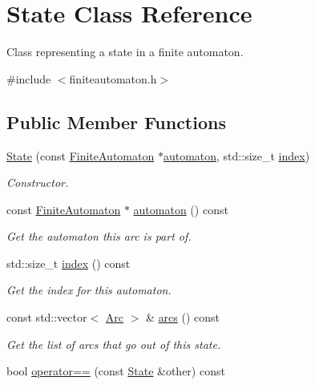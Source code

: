 \hypertarget{class_state}{\section{\-State \-Class \-Reference}
\label{class_state}
}


\-Class representing a state in a finite automaton.  




{\ttfamily \#include $<$finiteautomaton.\-h$>$}

\subsection*{\-Public \-Member \-Functions}
\begin{DoxyCompactItemize}
\item 
\hyperlink{class_state_a8c894ecdccae131bfbb0dcac55071f93}{\-State} (const \hyperlink{class_finite_automaton}{\-Finite\-Automaton} $\ast$\hyperlink{class_state_a8c07e7bc955ab9bd9cfc3691903269a6}{automaton}, std\-::size\-\_\-t \hyperlink{class_state_ae85fe3e5a9af340890a6bca98eeb31cc}{index})
\begin{DoxyCompactList}\small\item\em \-Constructor. \end{DoxyCompactList}\item 
const \hyperlink{class_finite_automaton}{\-Finite\-Automaton} $\ast$ \hyperlink{class_state_a8c07e7bc955ab9bd9cfc3691903269a6}{automaton} () const 
\begin{DoxyCompactList}\small\item\em \-Get the automaton this arc is part of. \end{DoxyCompactList}\item 
std\-::size\-\_\-t \hyperlink{class_state_ae85fe3e5a9af340890a6bca98eeb31cc}{index} () const 
\begin{DoxyCompactList}\small\item\em \-Get the index for this automaton. \end{DoxyCompactList}\item 
const std\-::vector$<$ \hyperlink{class_arc}{\-Arc} $>$ \& \hyperlink{class_state_a9ed91f5d1761b0581d94aa83edd503ca}{arcs} () const 
\begin{DoxyCompactList}\small\item\em \-Get the list of arcs that go out of this state. \end{DoxyCompactList}\item 
bool \hyperlink{class_state_a6687a56382a022034927ba43aad39524}{operator==} (const \hyperlink{class_state}{\-State} \&other) const 

\end{DoxyCompactItemize}
